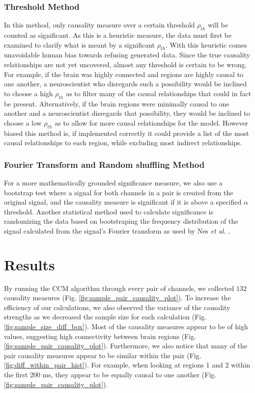\documentclass[journal,12pt,onecolumn,draftclsnofoot]{IEEEtran}  %
\begin{document}
\subsubsection{Threshold Method}
In this method, only causality measure over a certain threshold $\rho_{th}$ will be counted as significant. As this is a heuristic measure, the data must first be examined to clarify what is meant by a significant $\rho_{th}$. With this heuristic comes unavoidable human bias towards refusing generated data. Since the true causality relationships are not yet uncovered, almost any threshold is certain to be wrong. For example, if the brain was highly connected and regions are highly causal to one another, a neuroscientist who disregards such a possibility would be inclined to choose a high $\rho_{th}$ as to filter many of the causal relationships that could in fact be present. Alternatively, if the brain regions were minimally causal to one another and a neuroscientist disregards that possibility, they would be inclined to choose a low $\rho_{th}$ as to allow for more causal relationships for the model. However biased this method is, if implemented correctly it could provide a list of the most causal relationships to each region, while excluding most indirect relationships.

\subsubsection{Fourier Transform and Random shuffling Method}
For a more mathematically grounded significance measure, we also use a bootstrap test where a signal for both channels in a pair is created from the original signal, and the causality measure is significant if it is above a specified $\alpha$ threshold. Another statistical method used to calculate significance is randomizing the data based on bootstraping the frequency distribution of the signal calculated from the signal's Fourier transform as used by Nes \textit{et al.} \cite{Nes2015}\cite{Takens1981}.


\section{Results}
By running the CCM algorithm through every pair of channels, we collected $132$ causality measures (Fig. \ref{fig:sample_pair_causality_plot}). To increase the efficiency of our calculations, we also observed the variance of the causality strengths as we decreased the sample size for each calculation (Fig. \ref{fig:sample_size_diff_box}). Most of the causality measures appear to be of high values, suggesting high connectivity between brain regions (Fig. \ref{fig:sample_pair_causality_plot}). Furthermore, we also notice that many of the pair causality measures appear to be similar within the pair (Fig. \ref{fig:diff_within_pair_hist}). For example, when looking at regions 1 and 2 within the first 200 ms, they appear to be equally causal to one another (Fig. \ref{fig:sample_pair_causality_plot}).
\end{document}
